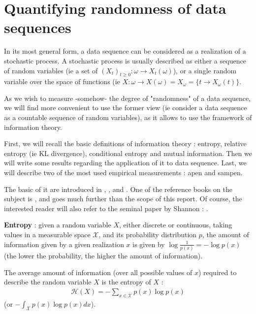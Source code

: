 \chapter{Quantifying randomness of data sequences}\label{sec:Entropy and randomness}

In its most general form, a data sequence can be considered as a realization of a stochastic process. A stochastic process is usually described as either a sequence of random variables (ie a set of $(X_t)_{t \geq 0} : \omega \rightarrow X_t({\omega})$), or a single random variable over the space of functions (ie $X : \omega \rightarrow X(\omega) = X_{\omega} = \{ t \rightarrow X_{\omega}(t) \}$.

As we wish to measure -somehow- the degree of "randomness" of a data sequence, we will find more convenient to use the former view (ie consider a data sequence as a countable sequence of random variables), as it allows to use the framework of information theory.

First, we will recall the basic definitions of information theory : entropy, relative entropy (ie KL divergence), conditional entropy and mutual information. Then we will write some results regarding the application of \gls{it} to data sequence. Last, we will describe two of the most used empirical measurements : \gls{apen} and \gls{sampen}.

The basic of \gls{it} are introduced in \cite{bishop_pattern_2016}, \cite{ProbabilisticGraphicalModels}, and \cite{ProbabilisticMachineLearning}. One of the reference books on the subject is \cite{cover_elements_2006}, and goes much further than the scope of this report. Of course, the interested reader will also refer to the seminal paper by Shannon : \cite{shannon_mathematical_1948}.

\textbf{Entropy} : given a random variable $X$, either discrete or continuous, taking values in a measurable space $\mathcal{X}$, and its probability distribution $p$, the amount of information given by a given realization $x$ is given by $\log{\frac{1}{p(x)}} = - \log{p(x)}$ (the lower the probability, the higher the amount of information). 

The average amount of information (over all possible values of $x$) required to describe the random variable $X$ is the entropy of $X$ : 
\begin{align}
    \mathcal{H}(X) = - \sum_{x \in \mathcal{X}} p(x)\log{p(x)}
\end{align}
(or $-\int_{\mathcal{X}} p(x)\log{p(x)}dx$).

